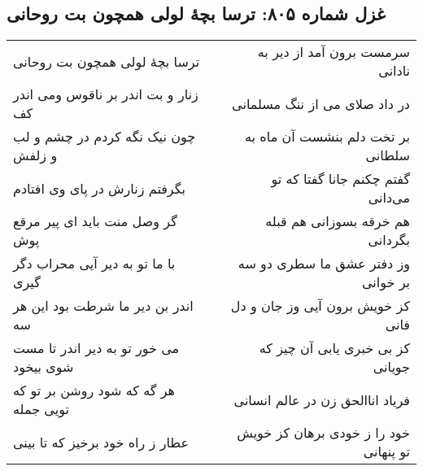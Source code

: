 \begin{center}
\section*{غزل شماره ۸۰۵: ترسا بچهٔ لولی همچون بت روحانی}
\label{sec:805}
\begin{longtable}{l p{0.5cm} r}
ترسا بچهٔ لولی همچون بت روحانی
&&
سرمست برون آمد از دیر به نادانی
\\
زنار و بت اندر بر ناقوس ومی اندر کف
&&
در داد صلای می از ننگ مسلمانی
\\
چون نیک نگه کردم در چشم و لب و زلفش
&&
بر تخت دلم بنشست آن ماه به سلطانی
\\
بگرفتم زنارش در پای وی افتادم
&&
گفتم چکنم جانا گفتا که تو می‌دانی
\\
گر وصل منت باید ای پیر مرقع پوش
&&
هم خرقه بسوزانی هم قبله بگردانی
\\
با ما تو به دیر آیی محراب دگر گیری
&&
وز دفتر عشق ما سطری دو سه بر خوانی
\\
اندر بن دیر ما شرطت بود این هر سه
&&
کز خویش برون آیی وز جان و دل فانی
\\
می خور تو به دیر اندر تا مست شوی بیخود
&&
کز بی خبری یابی آن چیز که جویانی
\\
هر گه که شود روشن بر تو که تویی جمله
&&
فریاد اناالحق زن در عالم انسانی
\\
عطار ز راه خود برخیز که تا بینی
&&
خود را ز خودی برهان کز خویش تو پنهانی
\\
\end{longtable}
\end{center}
